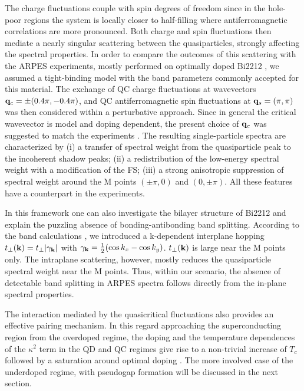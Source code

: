 \documentclass[twoside]{article}
\begin{document}
The charge fluctuations couple with spin degrees of freedom since in the
hole-poor regions the system is locally closer to half-filling where
antiferromagnetic correlations are more pronounced. Both charge and spin
fluctuations then mediate a nearly singular scattering between the
quasiparticles, strongly affecting the spectral properties. In order to
compare the outcomes of this scattering with the ARPES experiments, mostly
performed on optimally doped Bi2212 \cite{SAINI}, we assumed \cite{CAPRARA} a
tight-binding model with the band parameters commonly accepted for this
material.
The exchange of QC charge fluctuations at wavevectors ${\bf q}_c=\pm
(0.4\pi,-0.4\pi)$, and QC antiferromagnetic spin fluctuations at ${\bf q}_s=
(\pi,\pi)$ was then considered within a perturbative approach. Since in
general the critical wavevector is model
and doping dependent, the present choice of ${\bf q}_c$ was suggested
to match the experiments \cite{SAINI}.
The resulting single-particle spectra are
characterized by (i) a transfer of spectral weight from the quasiparticle
peak to the incoherent shadow peaks; (ii) a redistribution of the
low-energy spectral weight with a modification of the FS; (iii) a strong
anisotropic suppression of spectral weight around the M points
$(\pm\pi,0)$ and $(0,\pm\pi)$. All these
features have a counterpart in the experiments.

In this framework one can also investigate the bilayer structure of Bi2212
and explain the puzzling absence of bonding-antibonding band
splitting. According to the band calculations \cite{andersen},
we introduced \cite{CAPRARA2} a k-dependent interplane hopping
$t_\perp({\bf k})=t_\perp |\gamma_{\bf k}|$
with $\gamma_{\bf k}={1\over 2}(\cos k_x -\cos k_y )$.
$t_\perp({\bf k})$ is large near the M points only. The intraplane scattering,
however, mostly reduces the quasiparticle spectral weight near the M points.
Thus, within our scenario, the absence of detectable band splitting in ARPES
spectra follows directly from the in-plane spectral properties.

The interaction mediated by the quasicritical fluctuations also provides an
effective pairing mechanism. In this
regard approaching the superconducting region from the overdoped regime, the
doping and the temperature dependences of the $\kappa^2$ term in the QD and QC
regimes give rise to a non-trivial increase of $T_c$ followed by a
saturation around optimal doping \cite{prb96}. The more involved case of the
underdoped regime, with pseudogap formation will be discussed in the next
section.
\end{document}
